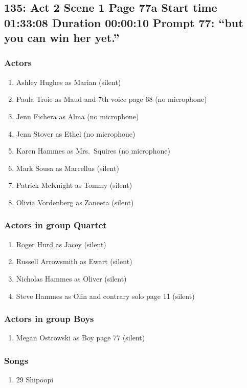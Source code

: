 \subsection{135: Act 2 Scene 1 Page 77a Start time 01:33:08 Duration 00:00:10 Prompt 77: ``but you can win her yet.''}

\subsubsection{Actors}
\begin{enumerate}
\item Ashley Hughes as Marian (silent)
\item Paula Troie as Maud and 7th voice page 68 (no microphone)
\item Jenn Fichera as Alma (no microphone)
\item Jenn Stover as Ethel (no microphone)
\item Karen Hammes as Mrs.~Squires (no microphone)
\item Mark Sousa as Marcellus (silent)
\item Patrick McKnight as Tommy (silent)
\item Olivia Vordenberg as Zaneeta (silent)
\end{enumerate}
\subsubsection{Actors in group Quartet}
\begin{enumerate}
\item Roger Hurd as Jacey (silent)
\item Russell Arrowsmith as Ewart (silent)
\item Nicholas Hammes as Oliver (silent)
\item Steve Hammes as Olin and contrary solo page 11 (silent)
\end{enumerate}
\subsubsection{Actors in group Boys}
\begin{enumerate}
\item Megan Ostrowski as Boy page 77 (silent)
\end{enumerate}

\subsubsection{Songs}
\begin{enumerate}
\item 29 Shipoopi
\end{enumerate}
